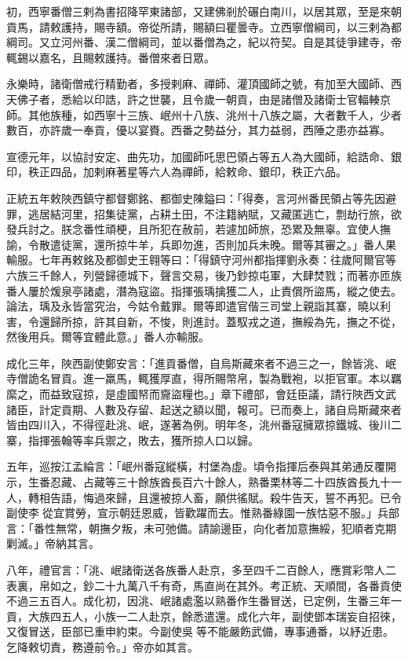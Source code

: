 \begin{pinyinscope}
初，西寧番僧三剌為書招降罕東諸部，又建佛剎於碾白南川，以居其眾，至是來朝貢馬，請敕護持，賜寺額。帝從所請，賜額曰瞿曇寺。立西寧僧綱司，以三剌為都綱司。又立河州番、漢二僧綱司，並以番僧為之，紀以符契。自是其徒爭建寺，帝輒錫以嘉名，且賜敕護持。番僧來者日眾。

永樂時，諸衛僧戒行精勤者，多授剌麻、禪師、灌頂國師之號，有加至大國師、西天佛子者，悉給以印誥，許之世襲，且令歲一朝貢，由是諸僧及諸衛士官輻輳京師。其他族種，如西寧十三族、岷州十八族、洮州十八族之屬，大者數千人，少者數百，亦許歲一奉貢，優以宴賚。西番之勢益分，其力益弱，西陲之患亦益寡。

宣德元年，以協討安定、曲先功，加國師吒思巴領占等五人為大國師，給誥命、銀印，秩正四品，加剌麻著星等六人為禪師，給敕命、銀印，秩正六品。

正統五年敕陜西鎮守都督鄭銘、都御史陳鎰曰：「得奏，言河州番民領占等先因避罪，逃居結河里，招集徒黨，占耕土田，不注籍納賦，又藏匿逃亡，剽劫行旅，欲發兵討之。朕念番性頑梗，且所犯在赦前，若遽加師旅，恐累及無辜。宜使人撫諭，令散遣徒黨，還所掠牛羊，兵即勿進，否則加兵未晚。爾等其審之。」番人果輸服。七年再敕銘及都御史王翱等曰：「得鎮守河州都指揮劉永奏：往歲阿爾官等六族三千餘人，列營歸德城下，聲言交易，後乃鈔掠屯軍，大肆焚戮；而著亦匝族番人屢於煖泉亭諸處，潛為寇盜。指揮張瑀擒獲二人，止責償所盜馬，縱之使去。論法，瑀及永皆當究治，今姑令戴罪。爾等即遣官偕三司堂上親詣其寨，曉以利害，令還歸所掠，許其自新，不悛，則進討。蓋馭戎之道，撫綏為先，撫之不從，然後用兵。爾等宜體此意。」番人亦輸服。

成化三年，陜西副使鄭安言：「進貢番僧，自烏斯藏來者不過三之一，餘皆洮、岷寺僧詭名冒貢。進一羸馬，輒獲厚直，得所賜幣帛，製為戰袍，以拒官軍。本以羈縻之，而益致寇掠，是虛國帑而齎盜糧也。」章下禮部，會廷臣議，請行陜西文武諸臣，計定貢期、人數及存留、起送之額以聞，報可。已而奏上，諸自烏斯藏來者皆由四川入，不得徑赴洮、岷，遂著為例。明年冬，洮州番寇擁眾掠鐵城、後川二寨，指揮張翰等率兵禦之，敗去，獲所掠人口以歸。

五年，巡按江孟綸言：「岷州番寇縱橫，村堡為虛。頃令指揮后泰與其弟通反覆開示，生番忍藏、占藏等三十餘族酋長百六十餘人，熟番栗林等二十四族酋長九十一人，轉相告語，悔過來歸，且還被掠人畜，願供徭賦。殺牛告天，誓不再犯。已令副使李從宜賞勞，宣示朝廷恩威，皆歡躍而去。惟熟番綠園一族怙惡不服。」兵部言：「番性無常，朝撫夕叛，未可弛備。請諭邊臣，向化者加意撫綏，犯順者克期剿滅。」帝納其言。

八年，禮官言：「洮、岷諸衛送各族番人赴京，多至四千二百餘人，應賞彩幣人二表裏，帛如之，鈔二十九萬八千有奇，馬直尚在其外。考正統、天順間，各番貢使不過三五百人。成化初，因洮、岷諸處濫以熟番作生番冒送，已定例，生番三年一貢，大族四五人，小族一二人赴京，餘悉遣還。成化六年，副使鄧本瑞妄自招徠，又復冒送，臣部已重申約束。今副使吳等不能嚴飭武備，專事通番，以紓近患。乞降敕切責，務遵前令。」帝亦如其言。


\end{pinyinscope}

